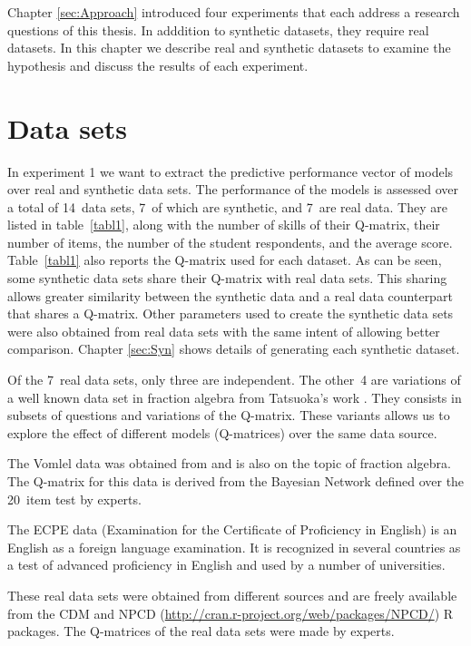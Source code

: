\label{sec:SIGNATURE}

Chapter \ref{sec:Approach} introduced four experiments that each address a research questions of this thesis. In adddition to synthetic datasets, they require real datasets.  In this chapter we describe real and synthetic datasets to examine the hypothesis and discuss the results of each experiment.

\section{Data sets}

In experiment 1 we want to extract the predictive performance vector of models over real and synthetic data sets. The performance of the models is assessed over a total of 14~data sets, 7~of which are synthetic, and 7~are real data.  They are listed in table~\ref{tabl1}, along with the number of skills of their Q-matrix, their number of items, the number of the student respondents, and the average score.  Table~\ref{tabl1} also reports the Q-matrix used for each dataset.  As can be seen, some synthetic data sets share their Q-matrix with real data sets.  This sharing allows greater similarity between the synthetic data and a real data counterpart that shares a Q-matrix.  Other parameters used to create the synthetic data sets were also obtained from real data sets with the same intent of allowing better comparison. Chapter \ref{sec:Syn} shows details of generating each synthetic dataset.

Of the 7~real data sets, only three are independent.  The other~4 are variations of a well known data set in fraction algebra from Tatsuoka's work \citep{tatsuoka1984analysis}.  They consists in subsets of questions and variations of the Q-matrix.  These variants allows us to explore the effect of different models (Q-matrices) over the same data source.

The Vomlel data was obtained from \citep{vomlel:2004} and is also on the topic of fraction algebra.  The Q-matrix for this data is derived from the Bayesian Network defined over the 20~item test by experts.

The ECPE data (Examination for the Certificate of Proficiency in English) is an English as a foreign language examination. It is recognized in several countries as a test of advanced proficiency in English and used by a number of universities.

These real data sets were obtained from different sources and are freely available from the CDM \citep{Robitzsch2012} and NPCD ({\url{http://cran.r-project.org/web/packages/NPCD/}}) R packages. The Q-matrices of the real data sets were made by experts.

